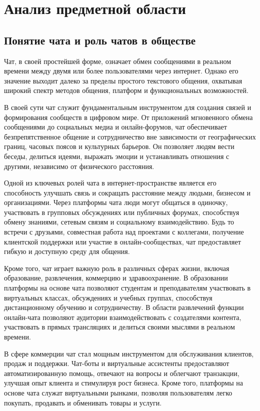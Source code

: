 \section{Анализ предметной области}
\subsection{Понятие чата и роль чатов в обществе}

Чат, в своей простейшей форме, означает обмен сообщениями в реальном времени между двумя или более пользователями через интернет. Однако его значение выходит далеко за пределы простого текстового общения, охватывая широкий спектр методов общения, платформ и функциональных возможностей.

В своей сути чат служит фундаментальным инструментом для создания связей и формирования сообществ в цифровом мире. От приложений мгновенного обмена сообщениями до социальных медиа и онлайн-форумов, чат обеспечивает безпрепятственное общение и сотрудничество вне зависимости от географических границ, часовых поясов и культурных барьеров. Он позволяет людям вести беседы, делиться идеями, выражать эмоции и устанавливать отношения с другими, независимо от физического расстояния.

Одной из ключевых ролей чата в интернет-пространстве является его способность улучшать связь и сокращать расстояние между людьми, бизнесом и организациями. Через платформы чата люди могут общаться в одиночку, участвовать в групповых обсуждениях или публичных форумах, способствуя обмену знаниями, сетевым связям и социальному взаимодействию. Будь то встречи с друзьями, совместная работа над проектами с коллегами, получение клиентской поддержки или участие в онлайн-сообществах, чат предоставляет гибкую и доступную среду для общения.

Кроме того, чат играет важную роль в различных сферах жизни, включая образование, развлечения, коммерцию и здравоохранение. В образовании платформы на основе чата позволяют студентам и преподавателям участвовать в виртуальных классах, обсуждениях и учебных группах, способствуя дистанционному обучению и сотрудничеству. В области развлечений функции онлайн-чата позволяют аудитории взаимодействовать с создателями контента, участвовать в прямых трансляциях и делиться своими мыслями в реальном времени.

В сфере коммерции чат стал мощным инструментом для обслуживания клиентов, продаж и поддержки. Чат-боты и виртуальные ассистенты предоставляют автоматизированную помощь, отвечают на вопросы и облегчают транзакции, улучшая опыт клиента и стимулируя рост бизнеса. Кроме того, платформы на основе чата служат виртуальными рынками, позволяя пользователям легко покупать, продавать и обменивать товары и услуги.

